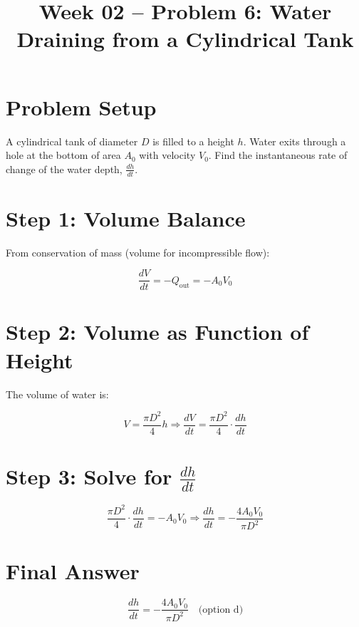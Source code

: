 \documentclass[12pt]{article}
\title{Week 02 -- Problem 6: Water Draining from a Cylindrical Tank}
\date{}
\begin{document}
\maketitle

\section*{Problem Setup}

A cylindrical tank of diameter \( D \) is filled to a height \( h \). Water exits through a hole at the bottom of area \( A_0 \) with velocity \( V_0 \). Find the instantaneous rate of change of the water depth, \( \frac{dh}{dt} \).

\section*{Step 1: Volume Balance}

From conservation of mass (volume for incompressible flow):

\[
\frac{dV}{dt} = -Q_{\text{out}} = -A_0 V_0
\]

\section*{Step 2: Volume as Function of Height}

The volume of water is:

\[
V = \frac{\pi D^2}{4} h \Rightarrow \frac{dV}{dt} = \frac{\pi D^2}{4} \cdot \frac{dh}{dt}
\]

\section*{Step 3: Solve for \(\frac{dh}{dt}\)}

\[
\frac{\pi D^2}{4} \cdot \frac{dh}{dt} = -A_0 V_0
\Rightarrow
\frac{dh}{dt} = -\frac{4 A_0 V_0}{\pi D^2}
\]

\section*{Final Answer}

\[
\boxed{ \frac{dh}{dt} = -\frac{4 A_0 V_0}{\pi D^2} } \quad \text{(option d)}
\]
\end{document}
